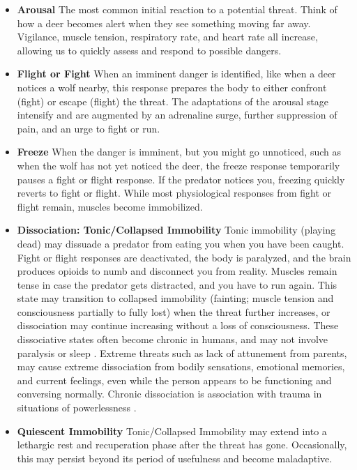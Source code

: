 \documentclass[12pt,letterpaper]{article}
\begin{document}
\begin{itemize}
    \item \textbf{Arousal} The most common initial reaction to a potential threat. Think of how a deer becomes alert when they see something moving far away. Vigilance, muscle tension, respiratory rate, and heart rate all increase, allowing us to quickly assess and respond to possible dangers.
    \item \textbf{Flight or Fight} When an imminent danger is identified, like when a deer notices a wolf nearby, this response prepares the body to either confront (fight) or escape (flight) the threat. The adaptations of the arousal stage intensify and are augmented by an adrenaline surge, further suppression of pain, and an urge to fight or run.
    \item \textbf{Freeze} When the danger is imminent, but you might go unnoticed, such as when the wolf has not yet noticed the deer, the freeze response temporarily pauses a fight or flight response. If the predator notices you, freezing quickly reverts to fight or flight. While most physiological responses from fight or flight remain, muscles become immobilized.
    \item \textbf{Dissociation: Tonic/Collapsed Immobility} Tonic immobility (playing dead) may dissuade a predator from eating you when you have been caught. Fight or flight responses are deactivated, the body is paralyzed, and the brain produces opioids to numb and disconnect you from reality. Muscles remain tense in case the predator gets distracted, and you have to run again. This state may transition to collapsed immobility (fainting; muscle tension and consciousness partially to fully lost) when the threat further increases, or dissociation may continue increasing without a loss of consciousness. These dissociative states often become chronic in humans, and may not involve paralysis or sleep \cite{razviPSIP}. Extreme threats such as lack of attunement from parents, may cause extreme dissociation from bodily sensations, emotional memories, and current feelings, even while the person appears to be functioning and conversing normally. Chronic dissociation is association with trauma in situations of powerlessness \cite{loewensteinDissociation}. 
    \item \textbf{Quiescent Immobility} Tonic/Collapsed Immobility may extend into a lethargic rest and recuperation phase after the threat has gone. Occasionally, this may persist beyond its period of usefulness and become maladaptive.
\end{itemize}
\end{document}
